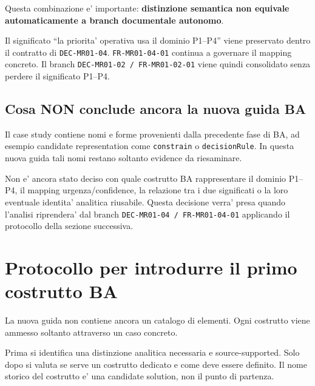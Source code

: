 \documentclass[11pt,a4paper]{article}
\begin{document}
Questa combinazione e' importante: \textbf{distinzione semantica non equivale automaticamente a branch documentale autonomo}.

\begin{ddtaexample}[title={Esito della review documentale}]
Il significato ``la priorita' operativa usa il dominio P1--P4'' viene preservato dentro il contratto di \texttt{DEC-MR01-04}. \texttt{FR-MR01-04-01} continua a governare il mapping concreto. Il branch \texttt{DEC-MR01-02 / FR-MR01-02-01} viene quindi consolidato senza perdere il significato P1--P4.
\end{ddtaexample}

\subsection{Cosa NON conclude ancora la nuova guida BA}

Il case study contiene nomi e forme provenienti dalla precedente fase di BA, ad esempio candidate representation come \texttt{constrain} o \texttt{decisionRule}. In questa nuova guida tali nomi restano soltanto evidence da riesaminare.

\begin{ddtaopen}[title={Construct admission ancora aperta}]
Non e' ancora stato deciso con quale costrutto BA rappresentare il dominio P1--P4, il mapping urgenza/confidence, la relazione tra i due significati o la loro eventuale identita' analitica riusabile. Questa decisione verra' presa quando l'analisi riprendera' dal branch \texttt{DEC-MR01-04 / FR-MR01-04-01} applicando il protocollo della sezione successiva.
\end{ddtaopen}

\section{Protocollo per introdurre il primo costrutto BA}

La nuova guida non contiene ancora un catalogo di elementi. Ogni costrutto viene ammesso soltanto attraverso un caso concreto.

\begin{ddtacore}[title={Construct admission rule}]
Prima si identifica una distinzione analitica necessaria e source-supported. Solo dopo si valuta se serve un costrutto dedicato e come deve essere definito. Il nome storico del costrutto e' una candidate solution, non il punto di partenza.
\end{ddtacore}
\end{document}
